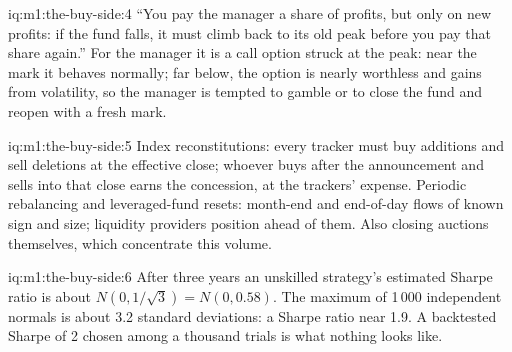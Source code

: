 \begin{solution}{iq:m1:the-buy-side:4}
``You pay the manager a share of profits, but only on new profits: if the
fund falls, it must climb back to its old peak before you pay that share
again.'' For the manager it is a call option struck at the peak: near the
mark it behaves normally; far below, the option is nearly worthless and
gains from volatility, so the manager is tempted to gamble or to close the
fund and reopen with a fresh mark.
\end{solution}

\begin{solution}{iq:m1:the-buy-side:5}
Index reconstitutions: every tracker must buy additions and sell deletions
at the effective close; whoever buys after the announcement and sells into
that close earns the concession, at the trackers' expense. Periodic
rebalancing and leveraged-fund resets: month-end and end-of-day flows of
known sign and size; liquidity providers position ahead of them. Also
closing auctions themselves, which concentrate this volume.
\end{solution}

\begin{solution}{iq:m1:the-buy-side:6}
After three years an unskilled strategy's estimated Sharpe ratio is about
$N(0, 1/\sqrt3) = N(0, 0.58)$. The maximum of 1\,000 independent normals is
about 3.2 standard deviations: a Sharpe ratio near 1.9. A backtested Sharpe
of 2 chosen among a thousand trials is what nothing looks like.
\end{solution}
